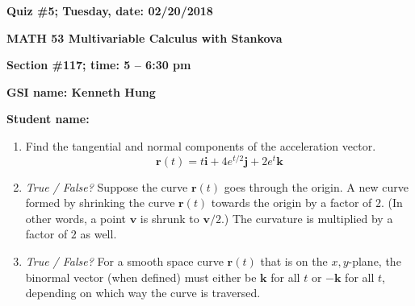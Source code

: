 \documentclass{article}
\newcommand{\rr}{\mathbf{r}}
\newcommand{\ii}{\mathbf{i}}
\newcommand{\jj}{\mathbf{j}}
\newcommand{\kk}{\mathbf{k}}
\begin{document}
{\bf Quiz \#5; Tuesday, date: 02/20/2018}

{\bf MATH 53 Multivariable Calculus with Stankova}

{\bf Section \#117; time: 5 -- 6:30 pm}

{\bf GSI name: Kenneth Hung}

{\bf Student name:}

\vspace*{0.25in}

\begin{enumerate}
\item Find the tangential and normal components of the acceleration vector.
\[
\rr(t) = t \ii + 4e^{t/2} \jj + 2e^t \kk
\]

\item {\em True / False?} Suppose the curve $\rr(t)$ goes through the origin. A new curve formed by shrinking the curve $\rr(t)$ towards the origin by a factor of $2$. (In other words, a point $\mathbf{v}$ is shrunk to $\mathbf{v} / 2$.) The curvature is multiplied by a factor of $2$ as well.

\item {\em True / False?} For a smooth space curve $\rr(t)$ that is on the $x, y$-plane, the binormal vector (when defined) must either be $\kk$ for all $t$ or $-\kk$ for all $t$, depending on which way the curve is traversed.
\end{enumerate}
\end{document}
